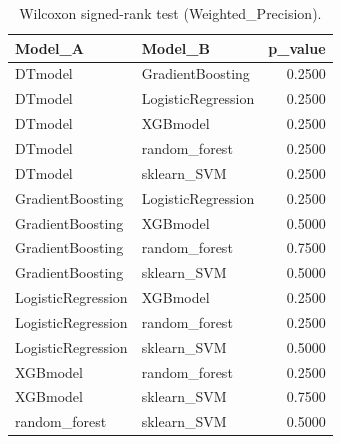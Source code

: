 \begin{table}[t]
\centering
\begin{tabular}{llr}
\toprule
Model_A & Model_B & p_value \\
\midrule
DTmodel & GradientBoosting & 0.2500 \\
DTmodel & LogisticRegression & 0.2500 \\
DTmodel & XGBmodel & 0.2500 \\
DTmodel & random_forest & 0.2500 \\
DTmodel & sklearn_SVM & 0.2500 \\
GradientBoosting & LogisticRegression & 0.2500 \\
GradientBoosting & XGBmodel & 0.5000 \\
GradientBoosting & random_forest & 0.7500 \\
GradientBoosting & sklearn_SVM & 0.5000 \\
LogisticRegression & XGBmodel & 0.2500 \\
LogisticRegression & random_forest & 0.2500 \\
LogisticRegression & sklearn_SVM & 0.5000 \\
XGBmodel & random_forest & 0.2500 \\
XGBmodel & sklearn_SVM & 0.7500 \\
random_forest & sklearn_SVM & 0.5000 \\
\bottomrule
\end{tabular}
\caption{Wilcoxon signed-rank test (Weighted_Precision).}
\label{tab:wilcoxon_Weighted_Precision}
\end{table}
